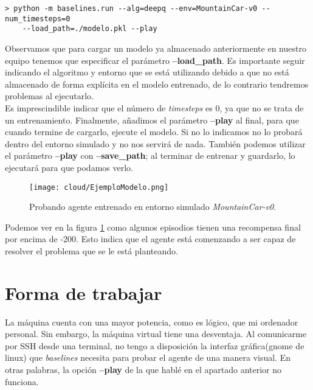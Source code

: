 \documentclass[11pt,fleqn]{book} %
\begin{document}
\begin{verbatim}
> python -m baselines.run --alg=deepq --env=MountainCar-v0 --num_timesteps=0
    --load_path=./modelo.pkl --play
\end{verbatim}

Observamos que para cargar un modelo ya almacenado anteriormente en nuestro equipo tenemos que especificar el parámetro \textbf{--load\_path}. Es importante seguir indicando el algoritmo y entorno que se está utilizando debido a que no está almacenado de forma explícita en el modelo entrenado, de lo contrario tendremos problemas al ejecutarlo. \\

Es imprescindible indicar que el número de \textit{timesteps} es 0, ya que no se trata de un entrenamiento. Finalmente, añadimos el parámetro \textbf{--play} al final, para que cuando termine de cargarlo, ejecute el modelo. Si no lo indicamos no lo probará dentro del entorno simulado y no nos servirá de nada. También podemos utilizar el parámetro \textbf{--play} con \textbf{--save\_path}; al terminar de entrenar y guardarlo, lo ejecutará para que podamos verlo.

\begin{figure}[H]
	\centering\texttt{[image: cloud/EjemploModelo.png]}
	\caption{Probando agente entrenado en entorno simulado \textit{MountainCar-v0}.}
	\label{fig:EjemploModelo} %
\end{figure}

Podemos ver en la figura \ref{fig:EjemploModelo} como algunos episodios tienen una recompensa final por encima de -200. Esto indica que el agente está comenzando a ser capaz de resolver el problema que se le está planteando.

\section{Forma de trabajar}

La máquina cuenta con una mayor potencia, como es lógico, que mi ordenador personal. Sin embargo, la máquina virtual tiene una desventaja. Al comunicarme por SSH desde una terminal, no tengo a disposición la interfaz gráfica(gnome de linux) que \textit{baselines} necesita para probar el agente de una manera visual. En otras palabras, la opción \textbf{--play} de la que hablé en el apartado anterior no funciona. \\
\end{document}
